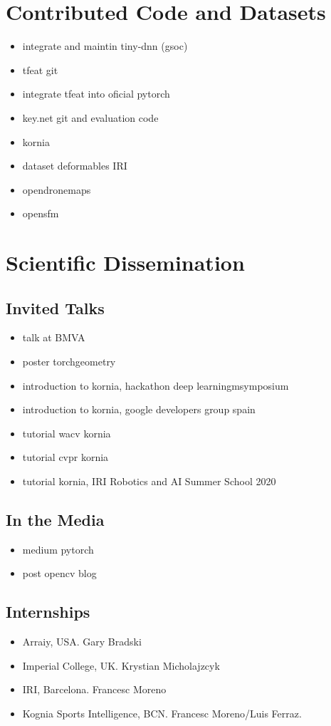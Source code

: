 \section{Contributed Code and Datasets}
\begin{itemize}
\item integrate and maintin tiny-dnn (gsoc)
\item tfeat git
\item integrate tfeat into oficial pytorch
\item key.net git and evaluation code
\item kornia
\item dataset deformables IRI
\item opendronemaps
\item opensfm
\end{itemize}

\section{Scientific Dissemination}

\subsection{Invited Talks}
\begin{itemize}
\item talk at BMVA
\item poster torchgeometry
\item introduction to kornia, hackathon deep learningmsymposium
\item introduction to kornia, google developers group spain
\item tutorial wacv kornia
\item tutorial cvpr kornia
\item tutorial kornia, IRI Robotics and AI Summer School 2020
\end{itemize}

\subsection{In the Media}
\begin{itemize}
\item medium pytorch
\item post opencv blog
\end{itemize}

\subsection{Internships}
\begin{itemize}
\item Arraiy, USA. Gary Bradski
\item Imperial College, UK. Krystian Micholajzcyk
\item IRI, Barcelona. Francesc Moreno
\item Kognia Sports Intelligence, BCN. Francesc Moreno/Luis Ferraz.
\end{itemize}

